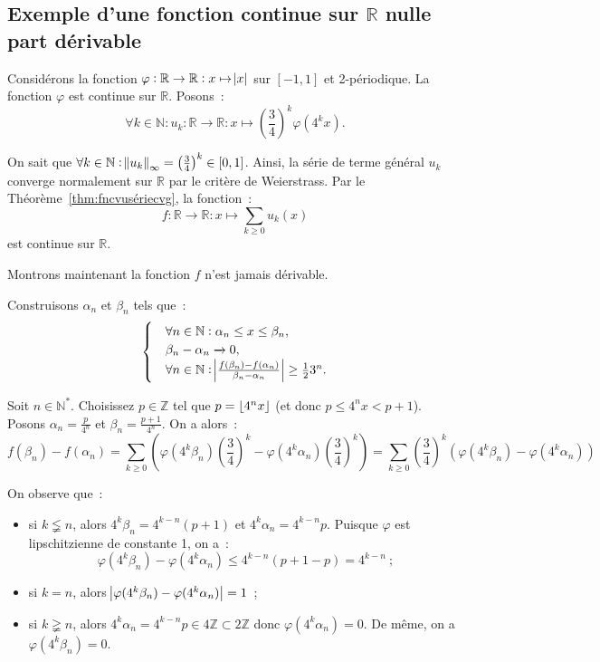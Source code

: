 \documentclass{report}
\theoremstyle{definition}
\theoremstyle{remark}
\newcommand{\R}{\mathbb R}
\newcommand{\Z}{\mathbb Z}
\newcommand{\N}{\mathbb N}
\newcommand{\Ns}{\N^{*}}
\DeclarePairedDelimiter{\floor}{\lfloor}{\rfloor}
\begin{document}
		\subsection{Exemple d'une fonction continue sur $\R$ nulle part dérivable}
			Considérons la fonction $\varphi : \R \to \R : x \mapsto \abs x$ sur $[-1, 1]$ et 2-périodique. La fonction $\varphi$ est continue sur $\R$. Posons~:
			\[\forall k \in \N : u_k : \R \to \R : x \mapsto \left(\frac 34\right)^k\varphi(4^kx).\]

			On sait que $\forall k \in \N : \norm {u_k}_\infty = \left(\frac 34\right)^k \in [0, 1]$. Ainsi, la série de terme général $u_k$ converge normalement
			sur $\R$ par le critère de Weierstrass. Par le Théorème~\ref{thm:fncvusériecvg}, la fonction~:
			\[f : \R \to \R : x \mapsto \sum_{k \geq 0}u_k(x)\]
			est continue sur $\R$.

			Montrons maintenant la fonction $f$ n'est jamais dérivable.

			Construisons $\alpha_n$ et $\beta_n$ tels que~:
			\begin{align*}\begin{cases}
				&\forall n \in \N : \alpha_n \leq x \leq \beta_n, \\
				&\beta_n - \alpha_n \xrightarrow[]{} 0, \\
				&\forall n \in \N : \abs {\frac {f(\beta_n) - f(\alpha_n)}{\beta_n - \alpha_n}} \geq \frac 123^n.
			\end{cases}\end{align*}

			Soit $n \in \Ns$. Choisissez $p \in \Z$ tel que $p = \floor {4^nx}$ (et donc $p \leq 4^nx < p+1$). Posons $\alpha_n = \frac p{4^n}$ et
			$\beta_n = \frac {p+1}{4^n}$. On a alors~:
			\[f(\beta_n) - f(\alpha_n) = \sum_{k \geq 0}\left(\varphi(4^k\beta_n)\left(\frac 34\right)^k - \varphi(4^k\alpha_n)\left(\frac 34\right)^k\right)
				= \sum_{k \geq 0}\left(\frac 34\right)^k\left(\varphi(4^k\beta_n) - \varphi(4^k\alpha_n)\right)\]

			On observe que~:
			\begin{itemize}
				\item si $k \lneqq n$, alors $4^k\beta_n = 4^{k-n}(p+1)$ et $4^k\alpha_n = 4^{k-n}p$. Puisque $\varphi$ est lipschitzienne de constante 1, on a~:
					\[\varphi(4^k\beta_n) - \varphi(4^k\alpha_n) \leq 4^{k-n}(p+1-p) = 4^{k-n}~;\]
				\item si $k = n$, alors $\abs {\varphi(4^k\beta_n) - \varphi(4^k\alpha_n)} = 1$~;
				\item si $k \gneqq n$, alors $4^k\alpha_n = 4^{k-n}p \in 4\Z \subset 2\Z$ donc $\varphi(4^k\alpha_n) = 0$.
					De même, on a $\varphi(4^k\beta_n) = 0$.
			\end{itemize}
\end{document}
